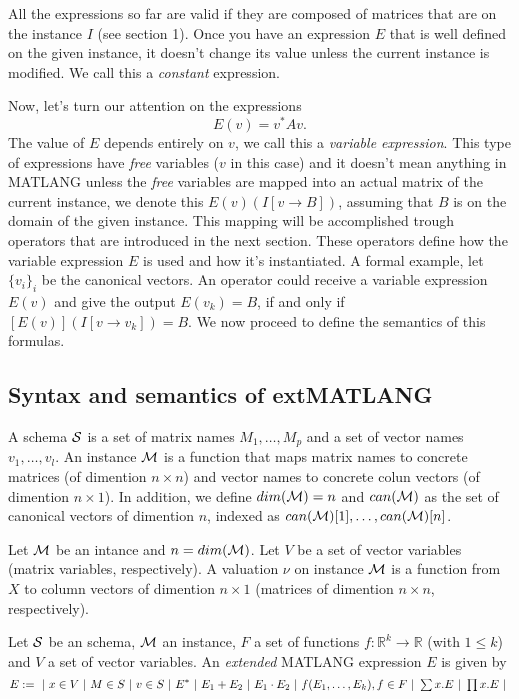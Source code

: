 All the expressions so far are valid if they are composed of matrices that are on the instance $I$ (see section 1). Once you have an expression $E$ that is well defined on the given instance, it doesn't change its value unless the current instance is modified. We call this a \textit{constant} expression.

Now, let's turn our attention on the expressions $$E(v)=v^* Av.$$ The value of $E$ depends entirely on $v$, we call this a \textit{variable expression}. This type of expressions have \textit{free} variables ($v$ in this case) and it doesn't mean anything in MATLANG unless the \textit{free} variables are mapped into an actual matrix of the current instance, we denote this $E(v)(I[v\rightarrow B])$, assuming that $B$ is on the domain of the given instance. This mapping will be accomplished trough operators that are introduced in the next section. These operators define how the variable expression $E$ is used and how it's instantiated.
A formal example, let $\lbrace v_i\rbrace_i$ be the canonical vectors. An operator could receive a variable expression $E(v)$ and give the output $E(v_k)=B$, if and only if $[E(v)](I[v\rightarrow v_k])=B$.
We now proceed to define the semantics of this formulas.

\subsection{Syntax and semantics of  extMATLANG}

A schema $\mathcal{S}$ is a set of matrix names $M_1,\ldots, M_p$ and a set of vector names $v_1,\ldots, v_l$.
An instance $\mathcal{M}$ is a function that maps matrix names to concrete matrices (of dimention $n\times n$) and vector names to concrete colun vectors (of dimention $n\times 1$). 
In addition, we define $dim(\mathcal{M})=n$ and $can(\mathcal{M})$ as the set of canonical vectors of dimention $n$, indexed as $can(\mathcal{M})[1], \ldots,can(\mathcal{M})[n]$.

Let $\mathcal{M}$ be an intance and $n=dim(\mathcal{M})$. Let $V$ be a set of vector variables (matrix variables, respectively). A valuation $\nu$ on instance $\mathcal{M}$ is a function from $X$ to column vectors of dimention $n\times 1$ (matrices of dimention $n\times n$, respectively). 

Let $\mathcal{S}$ be an schema, $\mathcal{M}$ an instance, $F$ a set of functions $f:\mathbb{R}^{k}\rightarrow\mathbb{R}$ (with $1\leq k$) and $V$ a set of vector variables. An \textit{extended} MATLANG expression $E$ is given by
$$
E:= \ |\  x\in V \ |\  M\in S \ |\  v\in S \ |\  E^* \ |\ E_1+E_2 \ |\  E_1\cdot E_2 \ |\  f(E_1,\ldots, E_k), f\in F \ |\  \ssum x. E \ |\  \sprod x. E \ |\ 
$$

